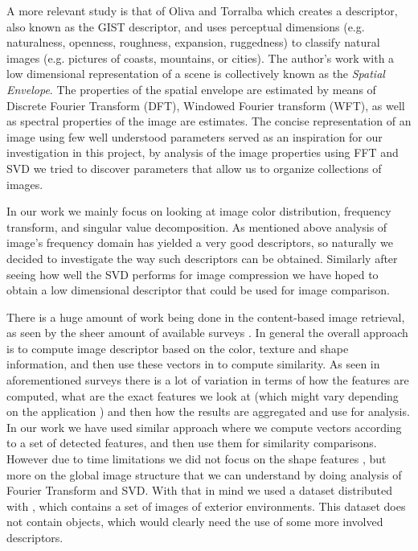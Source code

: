 \documentclass{report}
\begin{document}
A more relevant study is that of Oliva and Torralba \cite{gist_descriptor} which creates a descriptor, also known as the GIST descriptor, and uses perceptual dimensions (e.g. naturalness, openness, roughness, expansion, ruggedness) to classify natural images (e.g. pictures of coasts, mountains, or cities). The author's work with a low dimensional representation of a scene is collectively known as the \emph{Spatial Envelope}. The properties of the spatial envelope are estimated by means of Discrete Fourier Transform (DFT), Windowed Fourier transform (WFT), as well as spectral properties of the image are estimates. The concise representation of an image using few well understood parameters served as an inspiration for our investigation in this project, by analysis of the image properties using FFT and SVD we tried to discover parameters that allow us to organize collections of images.

In our work we mainly focus on looking at image color distribution, frequency transform, and singular value decomposition.
As mentioned above analysis of image's frequency domain has yielded a very good descriptors, so naturally we decided to investigate the way such descriptors can be obtained. Similarly after seeing how well the SVD performs for image compression we have hoped to obtain a low dimensional descriptor that could be used for image comparison.

There is a huge amount of work being done in the content-based image retrieval, as seen by the sheer amount of available surveys \cite{survey1}\cite{survey2}\cite{survey3}. In general the overall approach is to compute image descriptor based on the color, texture and shape information, and then use these vectors in to compute similarity. As seen in aforementioned surveys there is a lot of variation in terms of how the features are computed, what are the exact features we look at (which might vary depending on the application ) and then how the results are aggregated and use for analysis.
In our work we have used similar approach where we compute vectors according to a set of detected features, and then use them for similarity comparisons. However due to time limitations we did not focus on the shape features \cite{sift}, but more on the global image structure that we can understand by doing analysis of Fourier Transform and SVD. With that in mind we used a dataset distributed with \cite{gist_descriptor}, which contains a set of images of exterior environments. This dataset does not contain objects, which would clearly need the use of some more involved descriptors.
\end{document}
